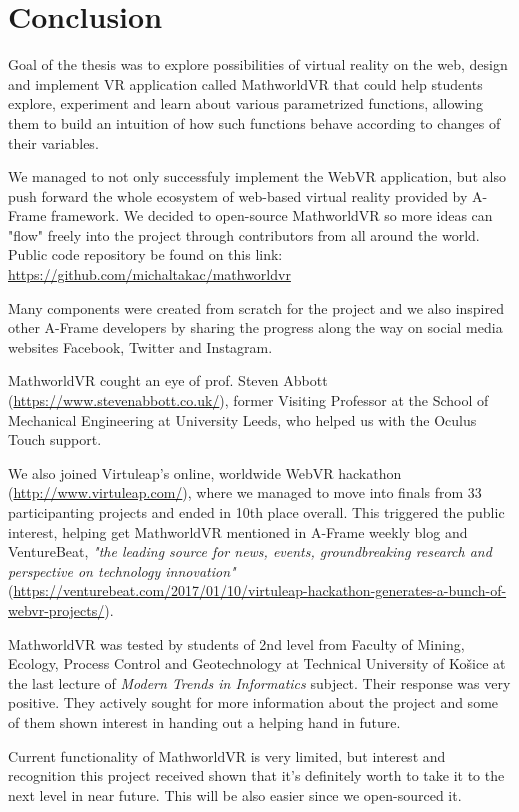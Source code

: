 \section{Conclusion}
Goal of the thesis was to explore possibilities of virtual reality on the web, design and implement VR application called MathworldVR that could help students explore, experiment and learn about various parametrized functions, allowing them to build an intuition of how such functions behave according to changes of their variables.

We managed to not only successfuly implement the WebVR application, but also push forward the whole ecosystem of web-based virtual reality provided by A-Frame framework. We decided to open-source MathworldVR so more ideas can "flow" freely into the project through contributors from all around the world. Public code repository be found on this link: \url{https://github.com/michaltakac/mathworldvr}

Many components were created from scratch for the project and we also inspired other A-Frame developers by sharing the progress along the way on social media websites Facebook, Twitter and Instagram.

MathworldVR cought an eye of prof. Steven Abbott (\url{https://www.stevenabbott.co.uk/}), former Visiting Professor at the School of Mechanical Engineering at University Leeds, who helped us with the Oculus Touch support.

We also joined Virtuleap's online, worldwide WebVR hackathon (\url{http://www.virtuleap.com/}), where we managed to move into finals from 33 participanting projects and ended in 10th place overall. This triggered the public interest, helping get MathworldVR mentioned in A-Frame weekly blog and VentureBeat, \textsl{"the leading source for news, events, groundbreaking research and perspective on technology innovation"} (\url{https://venturebeat.com/2017/01/10/virtuleap-hackathon-generates-a-bunch-of-webvr-projects/}).

MathworldVR was tested by students of 2nd level from Faculty of Mining, Ecology, Process Control and Geotechnology at Technical University of Košice at the last lecture of \textsl{Modern Trends in Informatics} subject. Their response was very positive. They actively sought for more information about the project and some of them shown interest in handing out a helping hand in future.

Current functionality of MathworldVR is very limited, but interest and recognition this project received shown that it's definitely worth to take it to the next level in near future. This will be also easier since we open-sourced it. 

